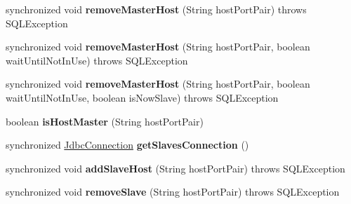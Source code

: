\begin{DoxyCompactItemize}
synchronized void {\bfseries remove\+Master\+Host} (String host\+Port\+Pair)  throws S\+Q\+L\+Exception 
\item 
\mbox{\label{classcom_1_1mysql_1_1cj_1_1jdbc_1_1ha_1_1_replication_connection_proxy_ad056ad35a7e862d6369517f937f995f9}} 
synchronized void {\bfseries remove\+Master\+Host} (String host\+Port\+Pair, boolean wait\+Until\+Not\+In\+Use)  throws S\+Q\+L\+Exception 
\item 
\mbox{\label{classcom_1_1mysql_1_1cj_1_1jdbc_1_1ha_1_1_replication_connection_proxy_ab37b33ee093138864fab30e6b778011d}} 
synchronized void {\bfseries remove\+Master\+Host} (String host\+Port\+Pair, boolean wait\+Until\+Not\+In\+Use, boolean is\+Now\+Slave)  throws S\+Q\+L\+Exception 
\item 
\mbox{\label{classcom_1_1mysql_1_1cj_1_1jdbc_1_1ha_1_1_replication_connection_proxy_a37155ee36d2c99c592a7095a73983833}} 
boolean {\bfseries is\+Host\+Master} (String host\+Port\+Pair)
\item 
\mbox{\label{classcom_1_1mysql_1_1cj_1_1jdbc_1_1ha_1_1_replication_connection_proxy_a8b165198e76f881febc7d965995b9c86}} 
synchronized \mbox{\hyperlink{interfacecom_1_1mysql_1_1cj_1_1jdbc_1_1_jdbc_connection}{Jdbc\+Connection}} {\bfseries get\+Slaves\+Connection} ()
\item 
\mbox{\label{classcom_1_1mysql_1_1cj_1_1jdbc_1_1ha_1_1_replication_connection_proxy_ac174913fdb2b32fe94ff30a17fdee529}} 
synchronized void {\bfseries add\+Slave\+Host} (String host\+Port\+Pair)  throws S\+Q\+L\+Exception 
\item 
\mbox{\label{classcom_1_1mysql_1_1cj_1_1jdbc_1_1ha_1_1_replication_connection_proxy_af9a57c012a15d412e468cdb1c6e2d5b6}} 
synchronized void {\bfseries remove\+Slave} (String host\+Port\+Pair)  throws S\+Q\+L\+Exception 
\item 
\mbox{\label{classcom_1_1mysql_1_1cj_1_1jdbc_1_1ha_1_1_replication_connection_proxy_a2635263e50bdfb575b21f1f03137902c}} 

\end{DoxyCompactItemize}
